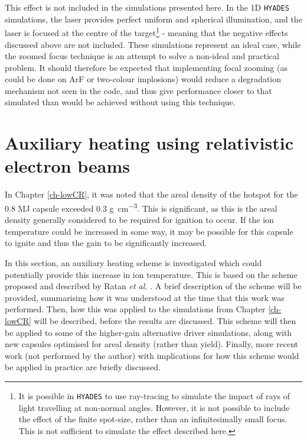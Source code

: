 This effect is not included in the simulations presented here. In the 1D \texttt{HYADES} simulations, the laser provides perfect uniform and spherical illumination, and the laser is focused at the centre of the target\footnote{It is possible in \texttt{HYADES} to use ray-tracing to simulate the impact of rays of light travelling at non-normal angles. However, it is not possible to include the effect of the finite spot-size, rather than an infinitesimally small focus. This is not sufficient to simulate the effect described here.} - meaning that the negative effects discussed above are not included. These simulations represent an ideal case, while the zoomed focus technique is an attempt to solve a non-ideal and practical problem. It should therefore be expected that implementing focal zooming (as could be done on ArF or two-colour implosions) would reduce a degradation mechanism not seen in the code, and thus give performance closer to that simulated than would be achieved without using this technique.

\section{Auxiliary heating using relativistic electron beams} \label{sec:AuxiliaryHeating}

In Chapter \ref{ch-lowCR}, it was noted that the areal density of the hotspot for the 0.8 MJ capsule exceeded 0.3 \unit{\gram\per\centi\meter\cubed}. This is significant, as this is the areal density generally considered to be required for ignition to occur. If the ion temperature could be increased in some way, it may be possible for this capsule to ignite and thus the gain to be significantly increased.

In this section, an auxiliary heating scheme is investigated which could potentially provide this increase in ion temperature. This is based on the scheme proposed and described by Ratan \textit{et al.} \cite{Ratan2017}. A brief description of the scheme will be provided, summarising how it was understood at the time that this work was performed. Then, how this was applied to the simulations from Chapter \ref{ch-lowCR} will be described, before the results are discussed. This scheme will then be applied to some of the higher-gain alternative driver simulations, along with new capsules optimised for areal density (rather than yield). Finally, more recent work (not performed by the author) with implications for how this scheme would be applied in practice are briefly discussed.


